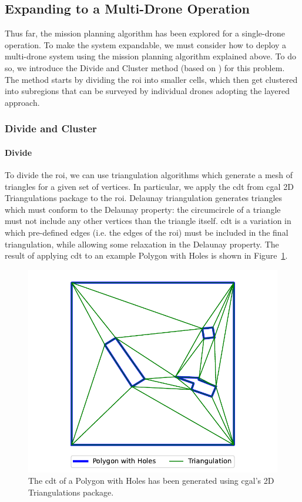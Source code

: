 \subsection{Expanding to a Multi-Drone Operation}
\label{sec:msp_multi_drone}

Thus far, the mission planning algorithm has been explored for a single-drone operation. To make the system expandable, we must consider how to deploy a multi-drone system using the mission planning algorithm explained above. To do so, we introduce the Divide and Cluster method (based on \cite{skorobogatov2021multi}) for this problem. The method starts by dividing the \gls{roi} into smaller cells, which then get clustered into subregions that can be surveyed by individual drones adopting the layered approach.

\subsubsection{Divide and Cluster}

\paragraph{Divide} To divide the \gls{roi}, we can use triangulation algorithms which generate a mesh of triangles for a given set of vertices. In particular, we apply the \gls{cdt} from \gls{cgal} 2D Triangulations package \cite{cgal2024triangulation} to the \gls{roi}. Delaunay triangulation generates triangles which must conform to the Delaunay property: the circumcircle of a triangle must not include any other vertices than the triangle itself. \gls{cdt} is a variation in which pre-defined edges (i.e. the edges of the \gls{roi}) must be included in the final triangulation, while allowing some relaxation in the Delaunay property. The result of applying \gls{cdt} to an example Polygon with Holes is shown in Figure~\ref{fig:msp_cdt}. 

\begin{figure}[h!]
    \centering
    \includegraphics[width=0.6\linewidth]{figs/Jihwan/cdt.pdf}
    \caption[Constrained Delaunay Triangulation of Polygon with Holes]
    {The \gls{cdt} of a Polygon with Holes has been generated using \gls{cgal}'s 2D Triangulations package.}
    \label{fig:msp_cdt}
\end{figure}


